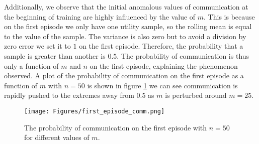 Additionally, we observe that the initial anomalous values of communication at the beginning of training are highly influenced by the value of $m$. This is because on the first episode we only have one utility sample, so the rolling mean is equal to the value of the sample. The variance is also zero but to avoid a division by zero error we set it to $1$ on the first episode. Therefore, the probability that a sample is greater than another is $0.5$. The probability of communication is thus only a function of $m$ and $n$ on the first episode, explaining the phenomenon observed. A plot of the probability of communication on the first episode as a function of $m$ with $n=50$ is shown in figure \ref{fig:EP1Comm} we can see communication is rapidly pushed to the extremes away from $0.5$ as $m$ is perturbed around $m=25$.

\begin{figure}
    \centering
    \texttt{[image: Figures/first\_episode\_comm.png]}
    \caption{The probability of communication on the first episode with $n=50$ for different values of $m$.}
    \label{fig:EP1Comm}
\end{figure}

